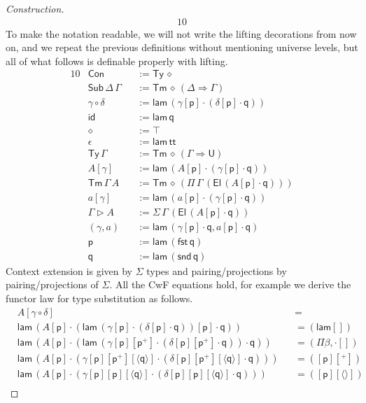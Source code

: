 \documentclass[sigplan,10pt,anonymous,review]{acmart}\settopmatter{printfolios=true,printccs=false,printacmref=false}
\newcommand{\Ra}{\Rightarrow}
\newcommand{\Ty}{\mathsf{Ty}}
\newcommand{\Tm}{\mathsf{Tm}}
\newcommand{\Con}{\mathsf{Con}}
\newcommand{\Sub}{\mathsf{Sub}}
\newcommand{\p}{\mathsf{p}}
\newcommand{\q}{\mathsf{q}}
\newcommand{\ext}{\mathop{\triangleright}}
\newcommand{\lam}{\mathsf{lam}}
\newcommand{\U}{\mathsf{U}}
\newcommand{\El}{\mathsf{El}}
\renewcommand{\tt}{\mathsf{tt}}
\newcommand{\fst}{\mathsf{fst}}
\newcommand{\snd}{\mathsf{snd}}
\newcommand{\id}{\mathsf{id}}
\begin{document}
\begin{proof}[Construction]
\begin{alignat*}{10}
  \end{alignat*}
  To make the notation readable, we will not write the lifting
  decorations from now on, and we repeat the previous definitions
  without mentioning universe levels, but all of what follows is
  definable properly with lifting.
  \begin{alignat*}{10}
    & \Con && := \Ty\,\diamond \\
    & \Sub\,\Delta\,\Gamma && := \Tm\,\diamond\,(\Delta\Ra\Gamma) \\
    & \gamma\circ\delta && := \lam\,(\gamma[\p]\cdot(\delta[\p]\cdot\q)) \\
    & \id && := \lam\,\q \\
    & \diamond && := \top \\
    & \epsilon && := \lam\,\tt \\
    & \Ty\,\Gamma && := \Tm\,\diamond\,(\Gamma\Ra\U) \\
    & A[\gamma] && := \lam\,(A[\p]\cdot(\gamma[\p]\cdot\q)) \\
    & \Tm\,\Gamma\,A && := \Tm\,\diamond\,(\Pi\,\Gamma\,(\El\,(A[\p]\cdot\q))) \\
    & a[\gamma] && := \lam\,(a[\p]\cdot(\gamma[\p]\cdot\q)) \\
    & \Gamma\ext A && := \Sigma\,\Gamma\,(\El\,(A[\p]\cdot\q)) \\
    & (\gamma,a) && := \lam\,(\gamma[\p]\cdot\q,a[\p]\cdot\q) \\
    & \p && := \lam\,(\fst\,\q) \\
    & \q && := \lam\,(\snd\,\q)
  \end{alignat*}
  Context extension is given by $\Sigma$ types and pairing/projections
  by pairing/projections of $\Sigma$. All the CwF equations hold, for
  example we derive the functor law for type substitution as follows.
  \begin{equation}
  \begin{alignedat}{10}\label{eq:functor}
    & A[\gamma\circ\delta] && {=} \\
    & \lam\,(A[\p]\cdot(\lam\,(\gamma[\p]\cdot(\delta[\p]\cdot\q))[\p]\cdot\q)) && {=}(\lam[]) \\
    & \lam\,(A[\p]\cdot(\lam\,(\gamma[\p][\p^+]\cdot(\delta[\p][\p^+]\cdot\q))\cdot\q)) && {=}(\Pi\beta, {\cdot}[]) \\
    & \lam\,(A[\p]\cdot(\gamma[\p][\p^+][\langle\q\rangle]\cdot(\delta[\p][\p^+][\langle\q\rangle]\cdot\q))) && {=}([\p][^+]) \\
    & \lam\,(A[\p]\cdot(\gamma[\p][\p][\langle\q\rangle]\cdot(\delta[\p][\p][\langle\q\rangle]\cdot\q))) && {=}([\p][\langle\rangle]) \\

\end{alignedat}
\end{equation}
\end{proof}
\end{document}
